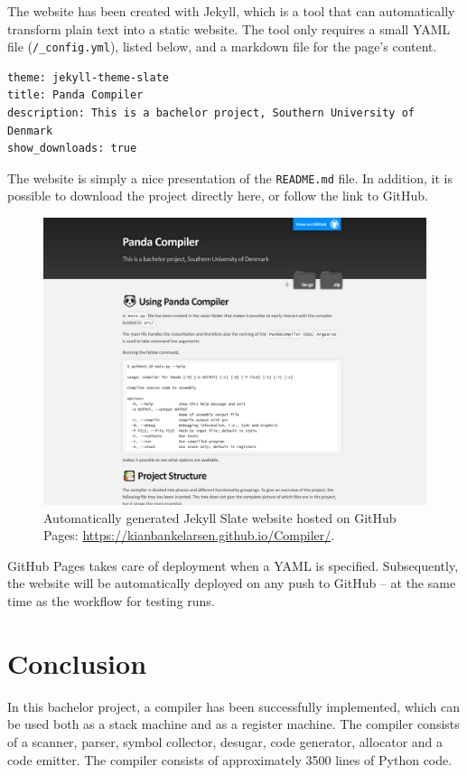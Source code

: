 The website has been created with Jekyll, which is a tool that can automatically transform plain text into a static website. The tool only requires a small YAML file (\texttt{/\_config.yml}), listed below, and a markdown file for the page's content.

\begin{verbatim}
theme: jekyll-theme-slate
title: Panda Compiler
description: This is a bachelor project, Southern University of Denmark
show_downloads: true
\end{verbatim}

The website is simply a nice presentation of the \texttt{README.md} file. In addition, it is possible to download the project directly here, or follow the link to GitHub.

\begin{figure}[H]
    \centering
    \includegraphics[width=1\textwidth]{misc/images/GitHub_Pages.png}
    \caption{Automatically generated Jekyll Slate website hosted on GitHub Pages: \url{https://kianbankelarsen.github.io/Compiler/}.}
    \label{fig:GitHub_Pages}
\end{figure}

GitHub Pages takes care of deployment when a YAML is specified. Subsequently, the website will be automatically deployed on any push to GitHub -- at the same time as the workflow for testing runs.

\chapter{Conclusion}
In this bachelor project, a compiler has been successfully implemented, which can be used both as a stack machine and as a register machine. The compiler consists of a scanner, parser, symbol collector, desugar, code generator, allocator and a code emitter. The compiler consists of approximately 3500 lines of Python code.

